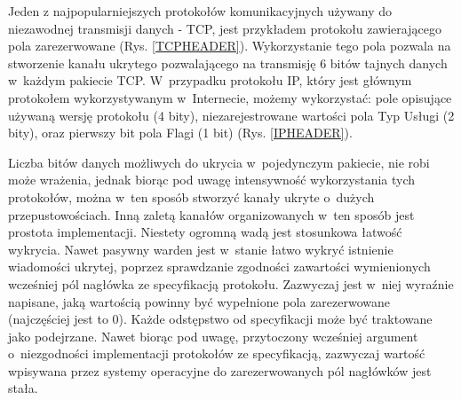 \documentclass[a4paper, twoside, 12pt]{report}
\begin{document}
        Jeden z najpopularniejszych protokołów komunikacyjnych używany do niezawodnej
        transmisji danych - TCP, jest przykładem protokołu zawierającego pola zarezerwowane (Rys. \ref{TCPHEADER}).
        Wykorzystanie tego pola pozwala na stworzenie kanału ukrytego pozwalającego
        na transmisję 6 bitów tajnych danych w~każdym pakiecie TCP. W~przypadku protokołu
        IP, który jest głównym protokołem wykorzystywanym w~Internecie, możemy wykorzystać: pole
        opisujące używaną wersję protokołu (4 bity), niezarejestrowane wartości pola Typ Usługi (2 bity),
        oraz pierwszy bit pola Flagi (1 bit) (Rys. \ref{IPHEADER})\cite{IPRFC}.

        Liczba bitów danych
        możliwych do ukrycia w~pojedynczym pakiecie, nie robi może wrażenia, jednak biorąc
        pod uwagę intensywność wykorzystania tych protokołów, można w~ten sposób
        stworzyć kanały ukryte o~dużych przepustowościach. Inną zaletą kanałów organizowanych
        w~ten sposób jest prostota implementacji. Niestety ogromną wadą jest stosunkowa
        łatwość wykrycia. Nawet pasywny warden jest w~stanie łatwo wykryć istnienie wiadomości
        ukrytej, poprzez sprawdzanie zgodności zawartości wymienionych wcześniej pól
        nagłówka ze specyfikacją protokołu. Zazwyczaj jest w~niej wyraźnie napisane,
        jaką wartością powinny być wypełnione pola zarezerwowane (najczęściej jest to 0).
        Każde odstępstwo od specyfikacji może być traktowane jako podejrzane. Nawet biorąc
        pod uwagę, przytoczony wcześniej argument o~niezgodności implementacji protokołów
        ze specyfikacją, zazwyczaj wartość wpisywana przez systemy operacyjne do
        zarezerwowanych pól nagłówków jest stała.
\end{document}
